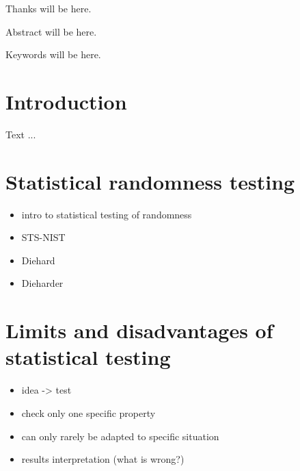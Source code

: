 \documentclass[12pt,oneside]{fithesis2}
\begin{document}
\FrontMatter
\ThesisTitlePage

\begin{ThesisDeclaration}
\DeclarationText
\AdvisorName
\end{ThesisDeclaration}

\begin{ThesisThanks}
Thanks will be here.
\end{ThesisThanks}

\begin{ThesisAbstract}
Abstract will be here.
\end{ThesisAbstract}

\begin{ThesisKeyWords}
Keywords will be here.
\end{ThesisKeyWords}

\MainMatter
\tableofcontents
\chapter{Introduction}
\label{chap:intro}
Text ...

\chapter{Statistical randomness testing}
\label{chap:stat-rand-testing}
\begin{itemize}
\item intro to statistical testing of randomness
\item STS-NIST
\item Diehard
\item Dieharder
\end{itemize}

\chapter{Limits and disadvantages of statistical testing}
\label{chap:limits-stat-testing}
\begin{itemize}
\item idea -> test
\item check only one specific property
\item can only rarely be adapted to specific situation
\item results interpretation (what is wrong?)
\end{itemize}
\end{document}
